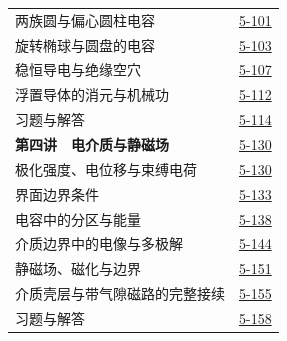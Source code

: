 \begin{longtable}{@{}p{}r@{}}
\hspace{1em}两族圆与偏心圆柱电容&\href{course-page:5:103}{5-101}\\[2pt]
\hspace{1em}旋转椭球与圆盘的电容&\href{course-page:5:105}{5-103}\\[2pt]
\hspace{1em}稳恒导电与绝缘空穴&\href{course-page:5:109}{5-107}\\[2pt]
\hspace{1em}浮置导体的消元与机械功&\href{course-page:5:114}{5-112}\\[2pt]
\hspace{1em}习题与解答&\href{course-page:5:116}{5-114}\\[2pt]
\textbf{第四讲　电介质与静磁场}&\href{course-page:5:132}{5-130}\\[2pt]
\hspace{1em}极化强度、电位移与束缚电荷&\href{course-page:5:132}{5-130}\\[2pt]
\hspace{1em}界面边界条件&\href{course-page:5:135}{5-133}\\[2pt]
\hspace{1em}电容中的分区与能量&\href{course-page:5:140}{5-138}\\[2pt]
\hspace{1em}介质边界中的电像与多极解&\href{course-page:5:146}{5-144}\\[2pt]
\hspace{1em}静磁场、磁化与边界&\href{course-page:5:153}{5-151}\\[2pt]
\hspace{1em}介质壳层与带气隙磁路的完整接续&\href{course-page:5:157}{5-155}\\[2pt]
\hspace{1em}习题与解答&\href{course-page:5:160}{5-158}\\[2pt]
\end{longtable}
